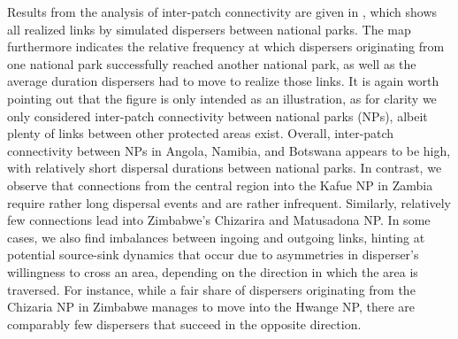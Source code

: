 \documentclass[abstract=on,10pt,a4paper,bibliography=totocnumbered]{article}
\begin{document}
Results from the analysis of inter-patch connectivity are given in
, which shows all realized links by simulated
dispersers between national parks. The map furthermore indicates the relative
frequency at which dispersers originating from one national park successfully
reached another national park, as well as the average duration dispersers had to
move to realize those links. It is again worth pointing out that the figure is
only intended as an illustration, as for clarity we only considered inter-patch
connectivity between national parks (NPs), albeit plenty of links between other
protected areas exist. Overall, inter-patch connectivity between NPs in Angola,
Namibia, and Botswana appears to be high, with relatively short dispersal
durations between national parks. In contrast, we observe that connections from
the central region into the Kafue NP in Zambia require rather long dispersal
events and are rather infrequent. Similarly, relatively few connections lead
into Zimbabwe's Chizarira and Matusadona NP. In some cases, we also find
imbalances between ingoing and outgoing links, hinting at potential source-sink
dynamics that occur due to asymmetries in disperser's willingness to cross an
area, depending on the direction in which the area is traversed. For instance,
while a fair share of dispersers originating from the Chizaria NP in Zimbabwe
manages to move into the Hwange NP, there are comparably few dispersers that
succeed in the opposite direction.

\end{document}

